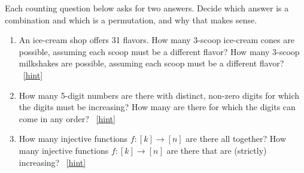 \documentclass{book}
\begin{document}
\setcounter{project}{116}
\addtocounter{project}{-1}
\begin{activity}[]\label{activity-109}
\hypertarget{p-829}{}%
Each counting question below asks for two answers.  Decide which answer is a combination and which is a permutation, and why that makes sense.%
\begin{enumerate}[font=\bfseries,label=(\alph*),ref=\alph*]
\item\label{task-150} \hypertarget{p-830}{}%
An ice-cream shop offers 31 flavors.  How many 3-scoop ice-cream cones are possible, assuming each scoop must be a different flavor?  How many 3-scoop milkshakes are possible, assuming each scoop must be a different flavor?%
~\hfill{\tiny\hyperlink{a-116.a}{[hint]}\hypertarget{q-116.a}{}}\item\label{task-151} \hypertarget{p-832}{}%
How many 5-digit numbers are there with distinct, non-zero digits for which the digits must be increasing?  How many are there for which the digits can come in any order?%
~\hfill{\tiny\hyperlink{a-116.b}{[hint]}\hypertarget{q-116.b}{}}\item\label{task-152} \hypertarget{p-834}{}%
How many injective functions \(f:[k] \to [n]\) are there all   together?  How many injective functions \(f:[k] \to [n]\) are there that are (strictly) increasing?%
~\hfill{\tiny\hyperlink{a-116.c}{[hint]}\hypertarget{q-116.c}{}}\end{enumerate}
\end{activity}
\end{document}
